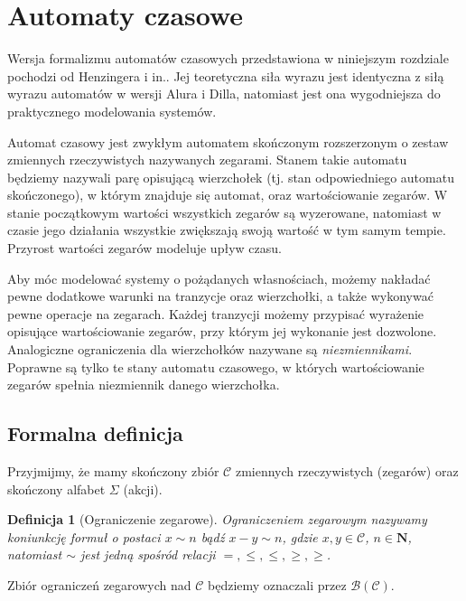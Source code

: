 \documentclass{pracamgr}
\theoremstyle{plain}
\newtheorem{definition}{Definicja}
\begin{document}
\section{Automaty czasowe} Wersja formalizmu automatów czasowych
przedstawiona w niniejszym rozdziale pochodzi od Henzingera i
in.\cite{henz-94}. Jej teoretyczna siła wyrazu jest identyczna z siłą
wyrazu automatów w wersji Alura i Dilla, natomiast jest ona
wygodniejsza do praktycznego modelowania systemów.

Automat czasowy jest zwykłym automatem skończonym rozszerzonym o
zestaw zmiennych rzeczywistych nazywanych zegarami.  Stanem takie
automatu będziemy nazywali parę opisującą wierzchołek (tj. stan
odpowiedniego automatu skończonego), w którym znajduje się automat,
oraz wartościowanie zegarów. W stanie początkowym wartości wszystkich
zegarów są wyzerowane, natomiast w czasie jego działania wszystkie
zwiększają swoją wartość w tym samym tempie. Przyrost wartości zegarów
modeluje upływ czasu.

Aby móc modelować systemy o pożądanych własnościach, możemy nakładać
pewne dodatkowe warunki na tranzycje oraz wierzchołki, a także
wykonywać pewne operacje na zegarach. Każdej tranzycji możemy
przypisać wyrażenie opisujące wartościowanie zegarów, przy którym jej
wykonanie jest dozwolone. Analogiczne ograniczenia dla wierzchołków
nazywane są \emph{niezmiennikami}. Poprawne są tylko te stany automatu
czasowego, w których wartościowanie zegarów spełnia niezmiennik danego
wierzchołka.


\subsection{Formalna definicja} Przyjmijmy, że mamy skończony zbiór
$\mathcal{C}$ zmiennych rzeczywistych (zegarów) oraz skończony alfabet
$\Sigma$ (akcji).

\begin{definition}[Ograniczenie zegarowe] Ograniczeniem zegarowym
nazywamy koniunkcję formuł o postaci $x \sim n$ bądź $x - y \sim n$,
gdzie $x, y \in \mathcal{C}$, $n \in \mathbf{N}$, natomiast $\sim$
jest jedną spośród relacji $=, \le, \leq, \ge, \geq$.
\end{definition}
Zbiór ograniczeń zegarowych nad $\mathcal{C}$ będziemy oznaczali przez
$\mathcal{B}(\mathcal{C})$.
\end{document}
